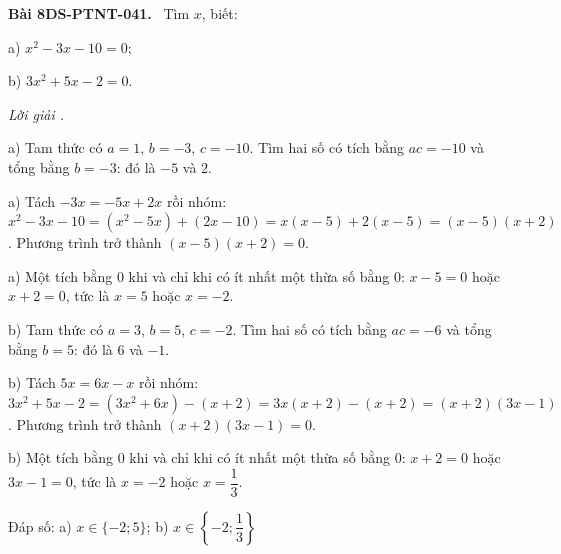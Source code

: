 \documentclass[12pt,a4paper]{article}
\newenvironment{problem}[1][]{\par\medskip\noindent\textbf{Bài #1.}\ }{\par}
\newenvironment{solution}[1][]{\par\noindent\textit{Lời giải #1.}\par}{\par}
\begin{document}
\begin{problem}[8DS-PTNT-041]
Tìm $x$, biết:

a) $x^2 - 3x - 10 = 0$;

b) $3x^2 + 5x - 2 = 0$.

\begin{solution}
a) Tam thức có $a = 1$, $b = -3$, $c = -10$. Tìm hai số có tích bằng $ac = -10$ và tổng bằng $b = -3$: đó là $-5$ và $2$.

a) Tách $-3x = -5x + 2x$ rồi nhóm: $x^2 - 3x - 10 = (x^2 - 5x) + (2x - 10) = x(x - 5) + 2(x - 5) = (x - 5)(x + 2)$. Phương trình trở thành $(x - 5)(x + 2) = 0$.

a) Một tích bằng $0$ khi và chỉ khi có ít nhất một thừa số bằng $0$: $x - 5 = 0$ hoặc $x + 2 = 0$, tức là $x = 5$ hoặc $x = -2$.

b) Tam thức có $a = 3$, $b = 5$, $c = -2$. Tìm hai số có tích bằng $ac = -6$ và tổng bằng $b = 5$: đó là $6$ và $-1$.

b) Tách $5x = 6x - x$ rồi nhóm: $3x^2 + 5x - 2 = (3x^2 + 6x) - (x + 2) = 3x(x + 2) - (x + 2) = (x + 2)(3x - 1)$. Phương trình trở thành $(x + 2)(3x - 1) = 0$.

b) Một tích bằng $0$ khi và chỉ khi có ít nhất một thừa số bằng $0$: $x + 2 = 0$ hoặc $3x - 1 = 0$, tức là $x = -2$ hoặc $x = \dfrac{1}{3}$.

Đáp số: a) $\boxed{x \in \{-2; 5\}}$; b) $\boxed{x \in \left\{-2; \dfrac{1}{3}\right\}}$
\end{solution}
\end{problem}
\end{document}
